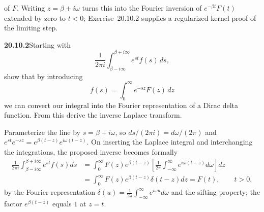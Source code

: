 of $F$.
Writing $z=\beta+i\omega$ turns this into the
Fourier inversion of $e^{-\beta t}F(t)$ extended by zero to
$t<0$; Exercise~20.10.2 supplies a regularized kernel proof
of the limiting step.

\par\bigskip
\noindent\textbf{20.10.2}\quad Starting with
\[
\frac{1}{2\pi i}\int_{\beta-i\infty}^{\beta+i\infty}
e^{st}f(s)\,ds,
\]
show that by introducing
\[
f(s)=\int_{0}^{\infty}e^{-sz}F(z)\,dz
\]
we can convert our integral into the Fourier representation of a
Dirac delta function. From this derive the inverse Laplace
transform.
\par{}
\solution
Parameterize the line by $s=\beta+i\omega$, so
$ds/(2\pi i)=d\omega/(2\pi)$ and
$e^{st}e^{-sz}=e^{\beta(t-z)}e^{i\omega(t-z)}$. On inserting
the Laplace integral and interchanging the integrations, the
proposed inverse becomes formally
\begin{align*}
\frac1{2\pi i}\int_{\beta-i\infty}^{\beta+i\infty}e^{st}f(s)ds
&=\int_0^\infty F(z)e^{\beta(t-z)}
\left[\frac1{2\pi}\int_{-\infty}^{\infty}
e^{i\omega(t-z)}d\omega\right]dz\\
&=\int_0^\infty F(z)e^{\beta(t-z)}\delta(t-z)dz=F(t),
\qquad t>0,
\end{align*}
by the Fourier representation
$\delta(u)=\frac1{2\pi}\int_{-\infty}^\infty e^{i\omega u}d\omega$
and the sifting property; the factor $e^{\beta(t-z)}$ equals $1$
at $z=t$.

